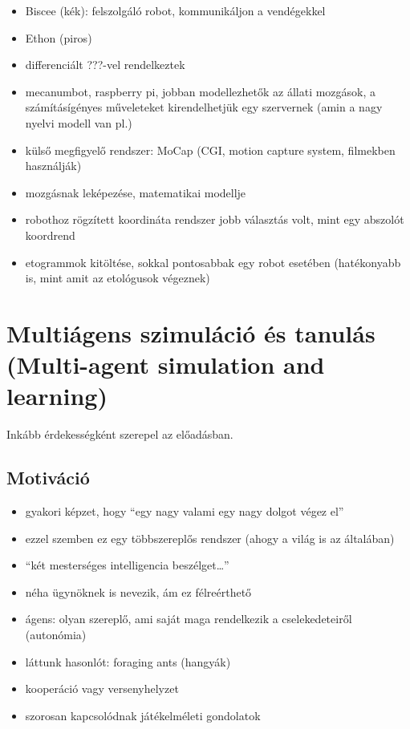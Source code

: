 \documentclass[a4paper, 11pt]{article}
\begin{document}
\begin{itemize}
	\item Biscee (kék): felszolgáló robot, kommunikáljon a vendégekkel
	\item Ethon (piros)
	\item differenciált ???-vel rendelkeztek
	\item mecanumbot, raspberry pi, jobban modellezhetők az állati mozgások, a számításígényes műveleteket kirendelhetjük egy szervernek (amin a nagy nyelvi modell van pl.)
	\item külső megfigyelő rendszer: MoCap (CGI, motion capture system, filmekben használják)
	\item mozgásnak leképezése, matematikai modellje
	\item robothoz rögzített koordináta rendszer jobb választás volt, mint egy abszolót koordrend
	\item etogrammok kitöltése, sokkal pontosabbak egy robot esetében (hatékonyabb is, mint amit az etológusok végeznek)
\end{itemize}

\newpage

\section{Multiágens szimuláció és tanulás (Multi-agent simulation and learning)}

Inkább érdekességként szerepel az előadásban.

\subsection{Motiváció}

\begin{itemize}
	\item gyakori képzet, hogy ``egy nagy valami egy nagy dolgot végez el''
	\item ezzel szemben ez egy többszereplős rendszer (ahogy a világ is az általában)
	\item ``két mesterséges intelligencia beszélget\dots''
	\item néha ügynöknek is nevezik, ám ez félreérthető
	\item ágens: olyan szereplő, ami saját maga rendelkezik a cselekedeteiről (autonómia)
	\item láttunk hasonlót: foraging ants (hangyák)
	\item kooperáció vagy versenyhelyzet
	\item szorosan kapcsolódnak játékelméleti gondolatok
\end{itemize}
\end{document}
